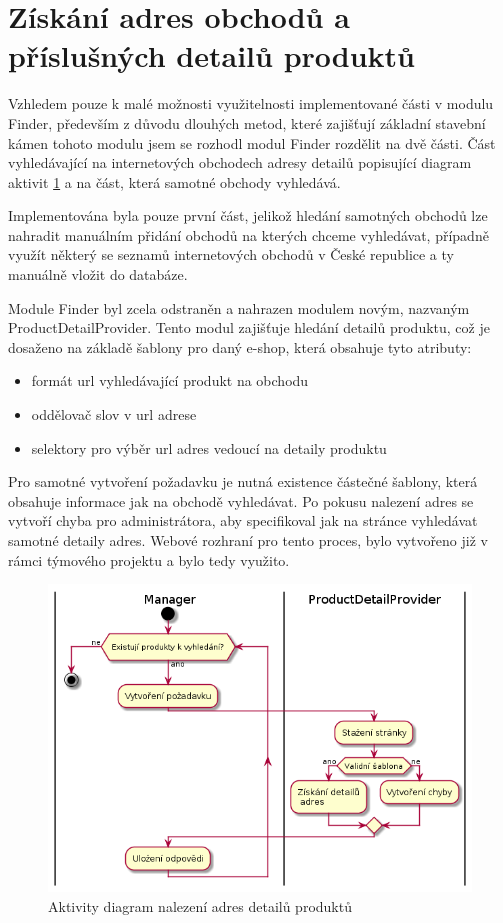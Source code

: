 \documentclass[thesis=B,czech]{FITthesis}[2012/06/26]
\begin{document}
\section{Získání adres obchodů a příslušných detailů produktů}
Vzhledem pouze k malé možnosti využitelnosti implementované části v modulu Finder, především z důvodu dlouhých metod, které zajišťují
základní stavební kámen tohoto modulu jsem se rozhodl modul Finder rozdělit na dvě části. Část vyhledávající 
na internetových obchodech adresy detailů popisující diagram aktivit \ref{fig:pdp-diagram} a na část, která samotné obchody vyhledává.
\par
Implementována byla pouze první část, jelikož hledání samotných obchodů lze nahradit manuálním přidání obchodů na kterých chceme vyhledávat, případně využít některý se seznamů internetových obchodů v České republice a ty manuálně vložit do databáze.
\par
Module Finder byl zcela odstraněn a nahrazen modulem novým, nazvaným ProductDetailProvider.
Tento modul zajišťuje hledání detailů produktu, což je dosaženo na základě šablony pro daný e-shop, která obsahuje 
tyto atributy:
\begin{itemize}
\item formát url vyhledávající produkt na obchodu
\item oddělovač slov v url adrese
\item selektory pro výběr url adres vedoucí na detaily produktu
\end{itemize}
Pro samotné vytvoření požadavku je nutná existence částečné šablony, která obsahuje informace jak na obchodě vyhledávat.
Po pokusu nalezení adres se vytvoří chyba pro administrátora, aby specifikoval jak na stránce vyhledávat samotné detaily adres. Webové rozhraní
pro tento proces, bylo vytvořeno již v rámci týmového projektu a bylo tedy využito.

\begin{figure}\centering
 	\includegraphics[width=1.0\textwidth]{resources/pdp-activity}
	\caption[Aktivity diagram nalezení adres detailů produktů]{
	Aktivity diagram nalezení adres detailů produktů}\label{fig:pdp-diagram}
\end{figure}
\end{document}
